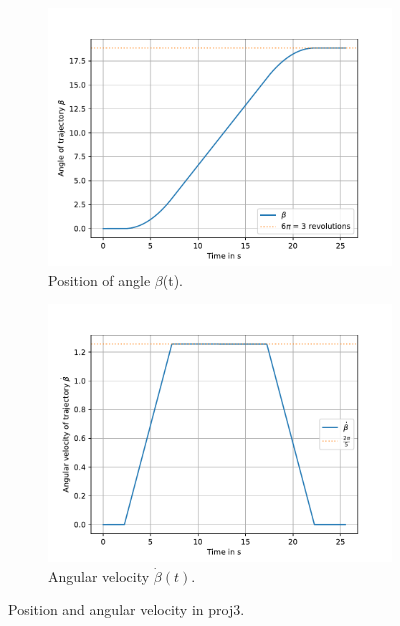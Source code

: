 \begin{figure}[H]
    \centering
    \begin{subfigure}[t]{0.48\textwidth}
        \centering
        \includegraphics[width=\textwidth]{SRC/Proj3Beta.pdf} %
        \caption{Position of angle $\beta$(t).}
        \label{fig:angular_position}
    \end{subfigure}
    \hfill
    \begin{subfigure}[t]{0.48\textwidth}
        \centering
        \includegraphics[width=\textwidth]{SRC/Proj3BetaDot.pdf} %
        \caption{Angular velocity $\dot{\beta}(t)$.}
        \label{fig:angular velocity}
    \end{subfigure}

  \caption{Position and angular velocity in proj3.}
    \label{fig:TauComparison}
\end{figure}


